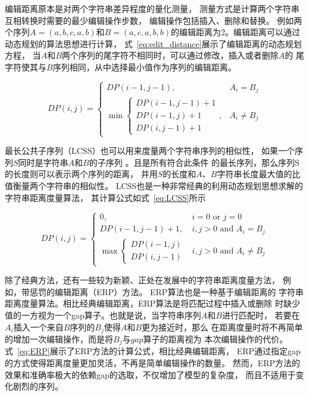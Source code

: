 编辑距离原本是对两个字符串差异程度的量化测量，
测量方式是计算两个字符串互相转换时需要的最少编辑操作步数，
编辑操作包括插入、删除和替换\cite{DBLP:journals/prl/Gorecki14}。
例如两个序列$A=\left(a,b,c,a,b\right)$和$B=\left(a,c,a,b,b\right)$的编辑距离为2。编辑距离可以通过动态规划的算法思想进行计算，
式~\ref{eq:edit_distance}展示了编辑距离的动态规划方程，
当$A$和$B$两个序列的尾字符不相同时，可以通过修改，插入或者删除$A$的
尾字符使其与$B$序列相同，从中选择最小值作为序列的编辑距离。


\begin{equation}
  DP(i, j)= \begin{cases}DP(i-1, j-1), & A_{i}=B_{j} \\
    \min \left\{\begin{array}{c}
    D P(i-1, j-1)+1 \\
    D P(i-1, j)+1 \\
    D P(i, j-1)+1
    \end{array}\right. , & A_{i} \neq B_{j}
  \end{cases}
  \label{eq:edit_distance}
\end{equation}

最长公共子序列（LCSS）也可以用来度量两个字符串序列的相似性，
如果一个序列$S$同时是字符串$A$和$B$的子序列
\cite{DBLP:conf/spire/BergrothHR00}。且是所有符合此条件
的最长序列，那么序列S的长度则可以表示两个序列的距离，
并用$S$的长度和$A$、$B$字符串长度最大值的比值衡量两个字符串的相似性。
LCSS也是一种非常经典的利用动态规划思想求解的字符串距离度量算法，
其计算公式如式~\ref{eq:LCSS}所示

\begin{equation}
  D P(i, j)= \begin{cases}0, & i=0 \text { or } j=0 \\ D P(i-1, j-1)+1, & i, j>0 \text { and } A_{i}=B_{j} \\ \max \begin{cases}D P(i-1, j) \\ D P(i, j-1)\end{cases} & i, j>0 \text { and } A_{i} \neq B_{j}\end{cases}
  \label{eq:LCSS}
\end{equation}

除了经典方法，还有一些较为新颖、正处在发展中的字符串距离度量方法，
例如，带惩罚的编辑距离（ERP）方法\cite{DBLP:conf/vldb/ChenN04}。
ERP算法也是一种基于编辑距离的
字符串距离度量算法。相比经典编辑距离，ERP算法是将匹配过程中插入或删除
时缺少值的一方视为一个gap算子。也就是说，当字符串序列$A$和$B$进行匹配时，
若要在$A_i$插入一个来自$B$序列的$B_j$使得$A$和$B$更为接近时，那么
在距离度量时将不再简单的增加一次编辑操作，而是将$B_j$与$gap$算子的距离视为
本次编辑操作的代价。式~\ref{eq:ERP}展示了ERP方法的计算公式，相比经典编辑距离，
ERP通过指定gap的方式使得距离度量更加灵活，不再是简单编辑操作的数量。
然而，ERP方法的效果和准确率极大的依赖gap的选取，不仅增加了模型的复杂度，
而且不适用于变化剧烈的序列。

